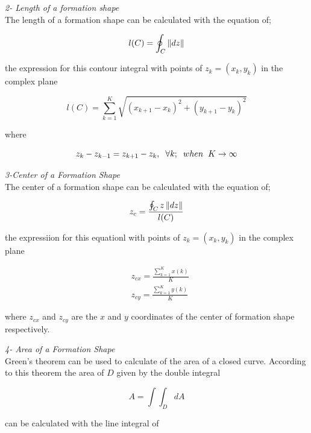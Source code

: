 \textit{ 	2- Length of a formation shape} \\ 
The length of a formation shape can be calculated with the equation of;
		
\begin{equation}
l(C)= \oint_C \left\lVert dz\right\rVert
\end{equation}
		
the expression for this contour integral with points of   $z_k = (x_k,y_k)$ in the complex plane

\begin{equation}
l(C) = \sum_{k=1}^{K}\sqrt{(x_{k+1} - x_k)^2 + (y_{k+1} - y_k)^2}
\end{equation}

where

\begin{equation}
z_k - z_{k-1} = z_{k+1} - z_k, \hspace{0.2cm}  \forall k ;  \hspace{0.2cm} when  \hspace{0.2cm} K \to\infty
\end{equation}
		
\textit{ 	3-Center of a Formation Shape} \\ 	
The center of a formation shape can be calculated with the equation of;

\begin{equation}
 z_c = \frac{\oint_C z\left\lVert dz\right\rVert}{l(C)}
\end{equation}
		
the expressiion for this equationl with points of  $z_k = (x_k,y_k)$ in the complex plane

\begin{align*}
&z_{cx} = \frac{\sum_{k=1}^{K}x(k)}{K}  \\
&z_{cy} = \frac{\sum_{k=1}^{K}y(k)}{K}  
\end{align*}
		
where $z_{cx}$ and $z_{cy}$ are the $x$ and $y$ coordinates of the center of formation shape respectively.

\textit{ 	4- Area of a Formation Shape} \\ 		
Green's theorem can be used to calculate of the area of a closed curve. According to this theorem the area of $D$ given by the double integral

\begin{equation}
 A = \int\int_D dA
\end{equation}
		
can be calculated with the line integral of


